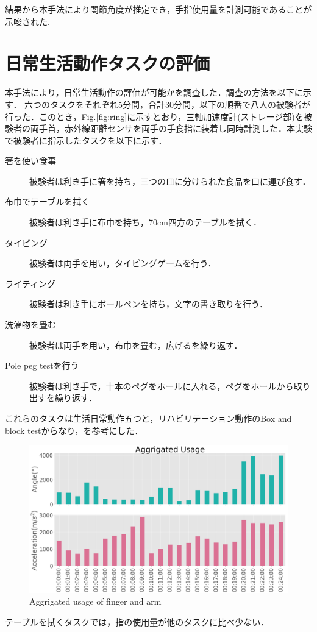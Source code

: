 結果から本手法により関節角度が推定でき，手指使用量を計測可能であることが示唆された.

\section{日常生活動作タスクの評価}
本手法により，日常生活動作の評価が可能かを調査した．調査の方法を以下に示す．
六つのタスクをそれぞれ5分間，合計30分間，以下の順番で八人の被験者が行った．このとき，Fig.\ref{fig:ring}に示すとおり，三軸加速度計(ストレージ部)を被験者の両手首，赤外線距離センサを両手の手食指に装着し同時計測した．本実験で被験者に指示したタスクを以下に示す．

\begin{description}
\item[箸を使い食事]
被験者は利き手に箸を持ち，三つの皿に分けられた食品を口に運び食す．

\item[布巾でテーブルを拭く]
被験者は利き手に布巾を持ち，70cm四方のテーブルを拭く．

\item[タイピング]
被験者は両手を用い，タイピングゲームを行う．

\item[ライティング]
被験者は利き手にボールペンを持ち，文字の書き取りを行う．

\item[洗濯物を畳む]
被験者は両手を用い，布巾を畳む，広げるを繰り返す．

\item[Pole peg testを行う]
被験者は利き手で，十本のペグをホールに入れる，ペグをホールから取り出すを繰り返す．

\end{description}

これらのタスクは生活日常動作五つと，リハビリテーション動作のBox and block testからなり，\cite{Taub2011,Mathiowetz1985}を参考にした．


\begin{figure}[H]
  \centering
  \includegraphics[width=0.8\linewidth]{fig/result}
  \caption{Aggrigated usage of finger and arm}
  \label{fig:usage}
\end{figure}


テーブルを拭くタスクでは，指の使用量が他のタスクに比べ少ない．
